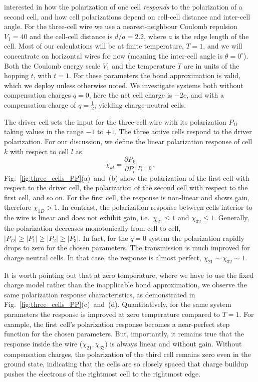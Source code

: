 interested in how the polarization of one cell \emph{responds} to the
polarization of a second cell, and how cell polarizations depend on cell-cell
distance and inter-cell angle. For the three-cell wire we use a
nearest-neighbour Coulomb repulsion $V_1 = 40$ and the cell-cell distance is
$d/a = 2.2$, where $a$ is the edge length of the cell. Most of our calculations
will be at finite temperature, $T = 1$, and we will concentrate on horizontal
wires for now (meaning the inter-cell angle is $\theta = 0^{\circ}$). Both the
Coulomb energy scale $V_1$ and the temperature $T$ are in units of the hopping $t$,
with $t = 1$. For these parameters the bond approximation is valid, which we
deploy unless otherwise noted. We investigate systems both without compensation
charges $q = 0$, here the net cell charge is $-2e$, and with a compensation
charge of $q=\frac{1}{2}$, yielding charge-neutral cells.

The driver cell sets the input for the three-cell wire with its
polarization $P_D$ taking values in the range $-1$ to $+1$. The three active
cells respond to the driver polarization. For our discussion, we define the
linear polarization response of cell $k$ with respect to cell $l$ as
%
\begin{equation}
  \label{eq:polarization_response}
  \chi_{kl} = \frac{\partial P_k}{\partial P_l}\big|_{P_l = 0} \, .
\end{equation}
%
Fig.~\ref{fig:three_cells_PP}(a)~and~(b) show the polarization of the first cell
with respect to the driver cell, the polarization of the second cell with
respect to the first cell, and so on. For the first cell, the response is
non-linear and shows gain, therefore $\chi_{1D} > 1$. In contrast, the
polarization response between cells interior to the wire is linear and does not
exhibit gain, i.e.\ $\chi_{21} \le 1$ and $\chi_{32} \le 1$. Generally, the
polarization decreases monotonically from cell to cell, $|P_D| \ge |P_1| \ge
|P_2| \ge |P_3|$. In fact, for the $q=0$ system the polarization rapidly drops
to zero for the chosen parameters. The transmission is much improved for charge
neutral cells. In that case, the response is almost perfect, $\chi_{21} \sim
\chi_{32} \sim 1$.

It is worth pointing out that at zero temperature, where we have to use the
fixed charge model rather than the inapplicable bond approximation, we observe
the same polarization response characteristics, as demonstrated in
Fig.~\ref{fig:three_cells_PP}(c)~and~(d). Quantitatively, for the same system
parameters the response is improved at zero temperature compared to $T=1$. For
example, the first cell's polarization response becomes a near-perfect step
function for the chosen parameters. But, importantly, it remains true that the
response inside the wire ($\chi_{21}, \chi_{32}$) is always linear and without
gain. Without compensation charges, the polarization of the third cell remains
zero even in the ground state, indicating that the cells are so closely spaced
that charge buildup pushes the electrons of the rightmost cell to the rightmost
edge.

